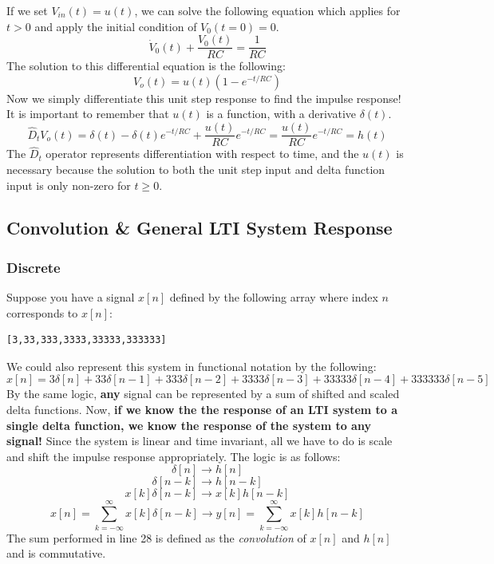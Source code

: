 \documentclass[a4paper]{article}
\numberwithin{equation}{section}
\begin{document}
If we set $V_{in}(t) = u(t)$, we can solve the following equation which applies for $t>0$ and apply the initial condition of $V_0(t=0)=0$.
\begin{equation}
\dot{V}_0(t)+\frac{V_0(t)}{RC}=\frac{1}{RC}
\end{equation}
The solution to this differential equation is the following:
\begin{equation}
V_{o}(t)=u(t)(1-e^{-t/RC})
\end{equation}
Now we simply differentiate this unit step response to find the impulse response! It is important to remember that $u(t)$ is a function, with a derivative $\delta(t)$.
\begin{equation}
\hat{D}_tV_{o}(t)=\delta(t)-\delta(t)e^{-t/RC}+\frac{u(t)}{RC}e^{-t/RC}=\frac{u(t)}{RC}e^{-t/RC} = h(t)
\end{equation}
The $\hat{D}_t$ operator represents differentiation with respect to time, and the $u(t)$ is necessary because the solution to both the unit step input and delta function input is only non-zero for $t\geq0$.

\subsection{Convolution \& General LTI System Response}
\subsubsection{Discrete}
Suppose you have a signal $x[n]$ defined by the following array where index $n$ corresponds to $x[n]$:
\begin{verbatim}
[3,33,333,3333,33333,333333]
\end{verbatim}
We could also represent this system in functional notation by the following:
\begin{equation}
x[n]=3\delta[n]+33\delta[n-1]+333\delta[n-2]+3333\delta[n-3]+33333\delta[n-4]+333333\delta[n-5]
\end{equation}
By the same logic, \textbf{any} signal can be represented by a sum of shifted and scaled delta functions. Now, \textbf{if we know the the response of an LTI system to a single delta function, we know the response of the system to any signal!} Since the system is linear and time invariant, all we have to do is scale and shift the impulse response appropriately. The logic is as follows:
\begin{equation}
\delta[n] \rightarrow h[n]
\end{equation}
\begin{equation}
\delta[n-k] \rightarrow h[n-k]
\end{equation}
\begin{equation}
x[k]\delta[n-k] \rightarrow x[k]h[n-k]
\end{equation}
\begin{equation}
x[n]=\sum_{k=-\infty}^{\infty}x[k]\delta[n-k] \rightarrow y[n]=\sum_{k=-\infty}^{\infty}x[k]h[n-k]
\end{equation}
The sum performed in line 28 is defined as the \textit{convolution} of $x[n]$ and $h[n]$ and is commutative. 
\end{document}
